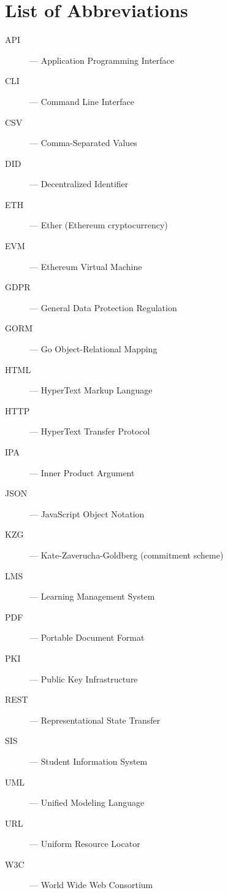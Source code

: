 \documentclass[a4paper,hidelinks,12pt]{report}
\begin{document}
\nocite{*}





\tableofcontents{}

\listoffigures
{}
\listoftables
{}

\pagebreak
\clearpage
{}
{}

\section*{List of Abbreviations}
\begin{description}
\item[API] — Application Programming Interface
\item[CLI] — Command Line Interface
\item[CSV] — Comma-Separated Values
\item[DID] — Decentralized Identifier
\item[ETH] — Ether (Ethereum cryptocurrency)
\item[EVM] — Ethereum Virtual Machine
\item[GDPR] — General Data Protection Regulation
\item[GORM] — Go Object-Relational Mapping
\item[HTML] — HyperText Markup Language
\item[HTTP] — HyperText Transfer Protocol
\item[IPA] — Inner Product Argument
\item[JSON] — JavaScript Object Notation
\item[KZG] — Kate-Zaverucha-Goldberg (commitment scheme)
\item[LMS] — Learning Management System
\item[PDF] — Portable Document Format
\item[PKI] — Public Key Infrastructure
\item[REST] — Representational State Transfer
\item[SIS] — Student Information System
\item[UML] — Unified Modeling Language
\item[URL] — Uniform Resource Locator
\item[W3C] — World Wide Web Consortium
\end{description}













\end{document}
